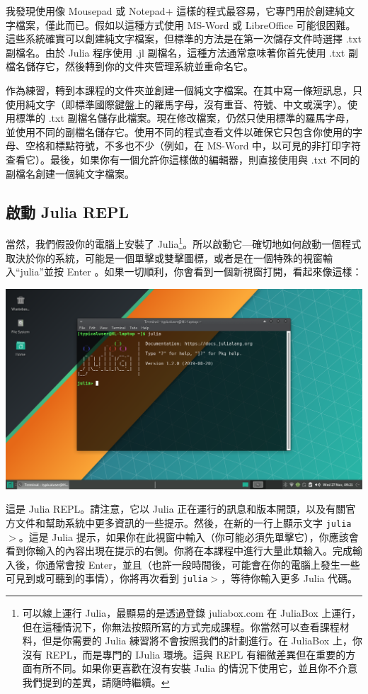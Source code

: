 \documentclass[]{article}
\begin{document}
我發現使用像 Mousepad 或 Notepad+ 這樣的程式最容易，它專門用於創建純文字檔案，僅此而已。假如以這種方式使用 MS-Word 或 LibreOffice 可能很困難。這些系統確實可以創建純文字檔案，但標準的方法是在第一次儲存文件時選擇 .txt 副檔名。由於 Julia 程序使用 .jl 副檔名，這種方法通常意味著你首先使用 .txt 副檔名儲存它，然後轉到你的文件夾管理系統並重命名它。

作為練習，轉到本課程的文件夾並創建一個純文字檔案。在其中寫一條短訊息，只使用純文字（即標準國際鍵盤上的羅馬字母，沒有重音、符號、中文或漢字）。使用標準的 .txt 副檔名儲存此檔案。現在修改檔案，仍然只使用標準的羅馬字母，並使用不同的副檔名儲存它。使用不同的程式查看文件以確保它只包含你使用的字母、空格和標點符號，不多也不少（例如，在 MS-Word 中，以可見的非打印字符查看它）。最後，如果你有一個允許你這樣做的編輯器，則直接使用與 .txt 不同的副檔名創建一個純文字檔案。

\subsection*{啟動 Julia REPL}

當然，我們假設你的電腦上安裝了 Julia\footnote{可以線上運行 Julia，最顯易的是透過登錄 juliabox.com 在 JuliaBox 上運行，但在這種情況下，你無法按照所寫的方式完成課程。你當然可以查看課程材料，但是你需要的 Julia 練習將不會按照我們的計劃進行。在 JuliaBox 上，你沒有 REPL，而是專門的 IJulia 環境。這與 REPL 有細微差異但在重要的方面有所不同。如果你更喜歡在沒有安裝 Julia 的情況下使用它，並且你不介意我們提到的差異，請隨時繼續。}。所以啟動它---確切地如何啟動一個程式取決於你的系統，可能是一個單擊或雙擊圖標，或者是在一個特殊的視窗輸入``julia''並按 Enter 。如果一切順利，你會看到一個新視窗打開，看起來像這樣：

\includegraphics[scale=0.25]{REPL.png}

這是 Julia REPL。請注意，它以 Julia 正在運行的訊息和版本開頭，以及有關官方文件和幫助系統中更多資訊的一些提示。然後，在新的一行上顯示文字 {\tt julia$ > $}。這是 Julia 提示，如果你在此視窗中輸入（你可能必須先單擊它），你應該會看到你輸入的內容出現在提示的右側。你將在本課程中進行大量此類輸入。完成輸入後，你通常會按 Enter，並且（也許一段時間後，可能會在你的電腦上發生一些可見到或可聽到的事情），你將再次看到 {\tt julia$ > $}，等待你輸入更多 Julia 代碼。
\end{document}
